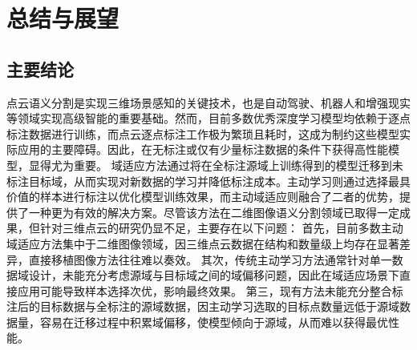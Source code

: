 \chapter{总结与展望}
\thispagestyle{others}
\pagestyle{others}
\xiaosi

\section{主要结论}
点云语义分割是实现三维场景感知的关键技术，也是自动驾驶、机器人和增强现实等领域实现高级智能的重要基础。然而，目前多数优秀深度学习模型均依赖于逐点标注数据进行训练，而点云逐点标注工作极为繁琐且耗时，这成为制约这些模型实际应用的主要障碍。因此，在无标注或仅有少量标注数据的条件下获得高性能模型，显得尤为重要。
域适应方法通过将在全标注源域上训练得到的模型迁移到未标注目标域，从而实现对新数据的学习并降低标注成本。主动学习则通过选择最具价值的样本进行标注以优化模型训练效果，而主动域适应则融合了二者的优势，提供了一种更为有效的解决方案。尽管该方法在二维图像语义分割领域已取得一定成果，但针对三维点云的研究仍显不足，主要存在以下问题：
首先，目前多数主动域适应方法集中于二维图像领域，因三维点云数据在结构和数量级上均存在显著差异，直接移植图像方法往往难以奏效。
其次，传统主动学习方法通常针对单一数据域设计，未能充分考虑源域与目标域之间的域偏移问题，因此在域适应场景下直接应用可能导致样本选择次优，影响最终效果。
第三，现有方法未能充分整合标注后的目标数据与全标注的源域数据，因主动学习选取的目标点数量远低于源域数据量，容易在迁移过程中积累域偏移，使模型倾向于源域，从而难以获得最优性能。

